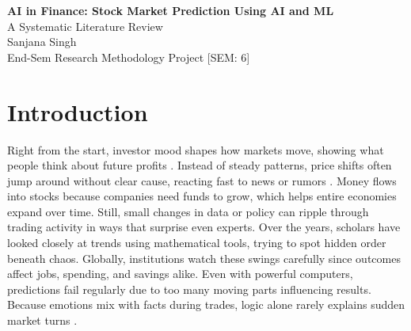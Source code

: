 \documentclass[11pt,a4paper]{article}
\begin{document}
\begin{center}
  {\LARGE\bfseries AI in Finance: Stock Market Prediction Using AI and ML}\\[0.4em]
  {\large A Systematic Literature Review}\\[1em]
  {\normalsize Sanjana Singh}\\[0.2em]
  {\small End-Sem Research Methodology Project [SEM: 6]}
\end{center}

\vspace{1em}

\begin{abstract}
\noindent This paper presents a systematic review of the literature on the application of machine
learning and artificial intelligence to predict stock market movements. The financial market process
is highly volatile and non-linear. Therefore, several studies have attempted to use advanced data
science techniques such as Random Forest, Support Vector Machine, Artificial Neural Network, Long
Short-Term Memory, and hybrid models to predict stock market trends with better accuracy. The
results indicate that while the use of artificial intelligence and machine learning leads to better
predictions, higher accuracy is still challenging mainly because of the volatility of the market. The
study recommends hybrid and ensemble models to better analyze multiple variables influencing stock
market trends. This review highlights research opportunities and directions for future studies on
the topic.
\end{abstract}

\section{Introduction}

Right from the start, investor mood shapes how markets move, showing what people think about
future profits \cite{khan2022}. Instead of steady patterns, price shifts often jump around without
clear cause, reacting fast to news or rumors \cite{subasi2021}. Money flows into stocks because
companies need funds to grow, which helps entire economies expand over time. Still, small changes
in data or policy can ripple through trading activity in ways that surprise even experts. Over the
years, scholars have looked closely at trends using mathematical tools, trying to spot hidden order
beneath chaos. Globally, institutions watch these swings carefully since outcomes affect jobs, spending,
and savings alike. Even with powerful computers, predictions fail regularly due to too many moving
parts influencing results. Because emotions mix with facts during trades, logic alone rarely explains
sudden market turns \cite{rouf2021}.
\end{document}
